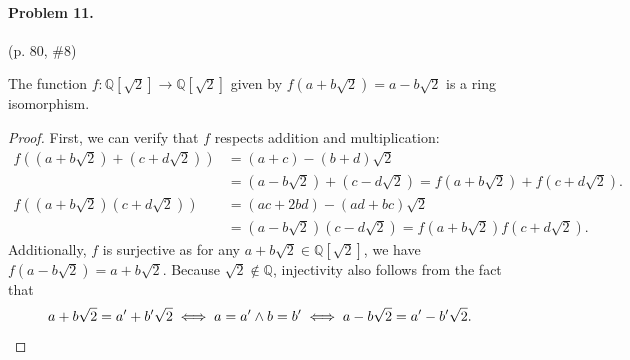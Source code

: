 \documentclass[12pt]{article}
\begin{document}
\paragraph{Problem 11.} (p. 80, \#8)

The function $ f : \mathbb Q[\sqrt{2}] \to \mathbb Q[\sqrt{2}]$ given by $f(a + b\sqrt{2}) = a - b\sqrt{2}$ is a ring isomorphism.

\begin{proof}
    First, we can verify that $f$ respects addition and multiplication:
    \begin{align*}
     f\left(\left(a + b\sqrt{2}\right)+ \left(c + d\sqrt{2}\right)\right) &= (a + c) - (b + d)\sqrt{2} \\ &= \left(a - b\sqrt{2}\right) + \left(c - d\sqrt{2}\right) = f\left(a + b \sqrt{2}\right) + f\left(c + d\sqrt{2}\right). \\
    f\left(\left(a + b\sqrt{2}\right)\left(c + d \sqrt{2}\right)\right) &= (ac + 2bd) - (ad + bc)\sqrt{2} \\ &= \left(a - b \sqrt{2}\right) \left(c - d\sqrt{2}\right) = f\left(a + b\sqrt{2}\right)f\left(c + d\sqrt{2}\right). 
    \end{align*}
    Additionally, $f$ is surjective as for any $a + b\sqrt{2} \in \mathbb Q[\sqrt{2}]$, we have $f\left(a - b\sqrt{2}\right) = a + b\sqrt{2}$. Because $\sqrt{2} \not\in \mathbb Q$, injectivity also follows from the fact that
    \[a + b\sqrt{2} = a' + b' \sqrt{2} \iff a = a' \land b = b' \iff a - b\sqrt{2} = a' - b'\sqrt{2}. \qedhere\]
\end{proof}
\end{document}
